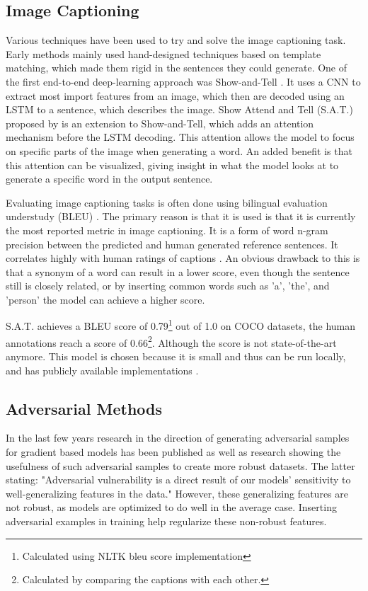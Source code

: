\subsection*{Image Captioning}
Various techniques have been used to try and solve the image captioning task. Early methods mainly used hand-designed techniques based on template matching, which made them rigid in the sentences they could generate. One of the first end-to-end deep-learning approach was Show-and-Tell \cite{showandtell}. It uses a CNN to extract most import features from an image, which then are decoded using an LSTM \cite{lstm} to a sentence, which describes the image.
Show Attend and Tell (S.A.T.) proposed by \citeauthor{xu2016show} is an extension to Show-and-Tell, which adds an attention mechanism before the LSTM decoding. This attention allows the model to focus on specific parts of the image when generating a word. An added benefit is that this attention can be visualized, giving insight in what the model looks at to generate a specific word in the output sentence.

Evaluating image captioning tasks is often done using bilingual evaluation understudy (BLEU) \cite{papineni_roukos_ward_zhu_2001}. The primary reason is that it is used is that it is currently the most reported metric in image captioning. It is a form of word n-gram precision between the predicted and human generated reference sentences. It correlates highly with human ratings of captions \cite{showandtell}. An obvious drawback to this is that a synonym of a word can result in a lower score, even though the sentence still is closely related, or by inserting common words such as 'a', 'the', and 'person' the model can achieve a higher score.

S.A.T. achieves a BLEU score of 0.79\footnote[1]{Calculated using NLTK\cite{nltk} bleu score implementation} out of 1.0 on COCO\cite{lin2015microsoft} datasets, the human annotations reach a score of 0.66\footnote[2]{Calculated by comparing the captions with each other.}. Although the score is not state-of-the-art\cite{DBLP:journals/corr/abs-2107-06912} anymore. This model is chosen because it is small and thus can be run locally, and has publicly available implementations \cite{sgrvinod}.

\subsection*{Adversarial Methods}
In the last few years research in the direction of generating adversarial samples for gradient based models has been published \cite{goodfellow2015explaining,Kurakin} as well as research showing the usefulness of such adversarial samples\cite{Ilyas2019features} to create more robust datasets. The latter stating: "Adversarial vulnerability is a direct result of our models' sensitivity to well-generalizing features in the data." However, these generalizing features are not robust, as models are optimized to do well in the average case. Inserting adversarial examples in training help regularize these non-robust features\cite{https://doi.org/10.48550/arxiv.1611.01236}.


